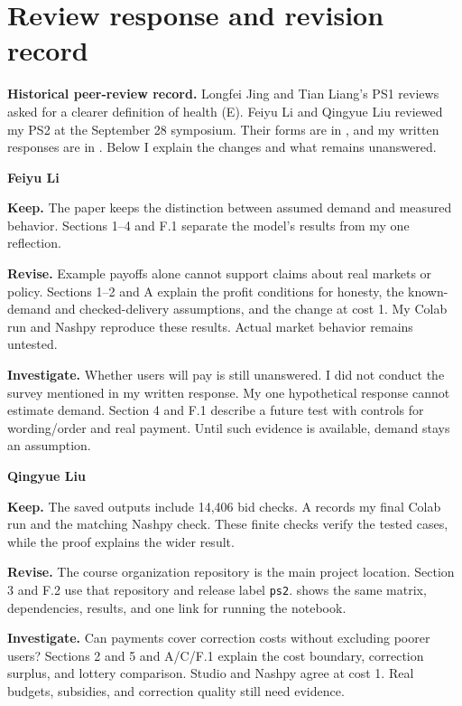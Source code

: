\FloatBarrier
\section{Review response and revision record}
\textbf{Historical peer-review record.} Longfei Jing and Tian Liang's PS1 reviews asked for a clearer definition of health (E). Feiyu Li and Qingyue Liu reviewed my PS2 at the September 28 symposium. Their forms are in , and my written responses are in . Below I explain the changes and what remains unanswered.

\noindent\textbf{Feiyu Li}\par
\textbf{Keep.} The paper keeps the distinction between assumed demand and measured behavior. Sections 1--4 and F.1 separate the model's results from my one reflection.

\textbf{Revise.} Example payoffs alone cannot support claims about real markets or policy. Sections 1--2 and A explain the profit conditions for honesty, the known-demand and checked-delivery assumptions, and the change at cost 1. My Colab run and Nashpy reproduce these results. Actual market behavior remains untested.

\textbf{Investigate.} Whether users will pay is still unanswered. I did not conduct the survey mentioned in my written response. My one hypothetical response cannot estimate demand. Section 4 and F.1 describe a future test with controls for wording/order and real payment. Until such evidence is available, demand stays an assumption.

\noindent\textbf{Qingyue Liu}\par
\textbf{Keep.} The saved outputs include 14,406 bid checks. A records my final Colab run and the matching Nashpy check. These finite checks verify the tested cases, while the proof explains the wider result.

\textbf{Revise.} The course organization repository is the main project location. Section 3 and F.2 use that repository and release label \texttt{ps2}.  shows the same matrix, dependencies, results, and one link for running the notebook.

\textbf{Investigate.} Can payments cover correction costs without excluding poorer users? Sections 2 and 5 and A/C/F.1 explain the cost boundary, correction surplus, and lottery comparison. Studio and Nashpy agree at cost 1. Real budgets, subsidies, and correction quality still need evidence.

